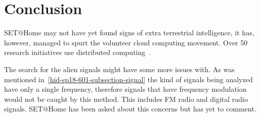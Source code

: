 \section{Conclusion}\label{hid-sp18-601-section-conclusions}

SET$@$Home may not have yet found signs of extra terrestrial intelligence, it 
has, however, managed to spurt the volunteer cloud computing movement. Over 50
research initiatives use distributed 
computing~\cite{hid-sp18-601-www-boinc-projects}.

The search for the alien signals might have some more issues with. As was 
mentioned in~\ref{hid-sp18-601-subsection-signal} the kind of signals being 
analyzed have only a single frequency, therefore signals that have frequency 
modulation would not be caught by this method. This includes FM radio and 
digital radio signals. SET$@$Home has been asked about this concerns but has 
yet to comment.


\begin{acks}

\end{acks}


 

